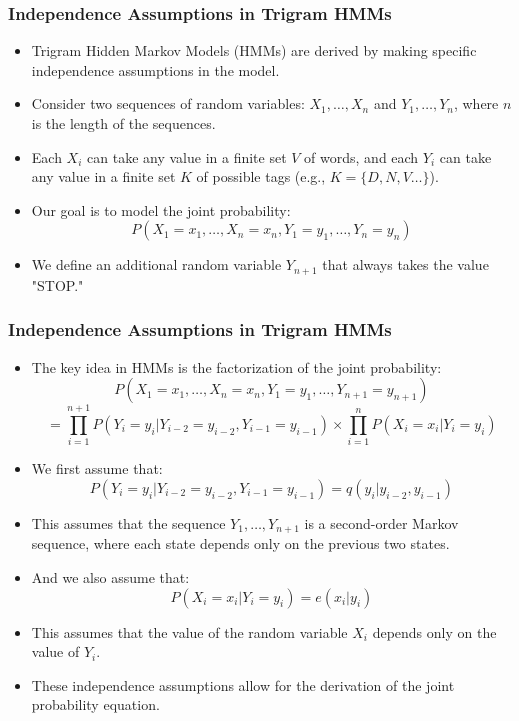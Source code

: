 \documentclass[handout]{beamer}
\begin{document}
\begin{frame}
\frametitle{Independence Assumptions in Trigram HMMs}
\scriptsize

\begin{itemize}
    \item Trigram Hidden Markov Models (HMMs) are derived by making specific independence assumptions in the model.
    
    \item Consider two sequences of random variables: $X_1, \ldots, X_n$ and $Y_1, \ldots, Y_n$, where $n$ is the length of the sequences.
    
    \item Each $X_i$ can take any value in a finite set $V$ of words, and each $Y_i$ can take any value in a finite set $K$ of possible tags (e.g., $K=\{D,N,V\dots \}$).
    
    \item Our goal is to model the joint probability:
    \[P(X_1 = x_1, \ldots, X_n = x_n, Y_1 = y_1, \ldots, Y_n = y_n)\]
    
    \item We define an additional random variable $Y_{n+1}$ that always takes the value "STOP."
    
\end{itemize}

\end{frame}



\begin{frame}
\frametitle{Independence Assumptions in Trigram HMMs}
\scriptsize

\begin{itemize}
    
    \item The key idea in HMMs is the factorization of the joint probability:
    \[P(X_1 = x_1, \ldots, X_n = x_n, Y_1 = y_1, \ldots, Y_{n+1} = y_{n+1})\]
    \[= \prod_{i=1}^{n+1} P(Y_i = y_i | Y_{i-2} = y_{i-2}, Y_{i-1} = y_{i-1}) \times \prod_{i=1}^{n} P(X_i = x_i | Y_i = y_i)\]
    
    \item We first assume that:
    \[P(Y_i = y_i | Y_{i-2} = y_{i-2}, Y_{i-1} = y_{i-1}) = q(y_i | y_{i-2}, y_{i-1})\]
    
    \item This assumes that the sequence $Y_1, \ldots, Y_{n+1}$ is a second-order Markov sequence, where each state depends only on the previous two states.
    
    \item And we also assume that:
      \[P(X_i = x_i | Y_i = y_i) = e(x_i | y_i)\]
    
  \item This assumes that the value of the random variable $X_i$ depends only on the value of $Y_i$.
    
    
    \item These independence assumptions allow for the derivation of the joint probability equation.
    

\end{itemize}

\end{frame}
\end{document}

